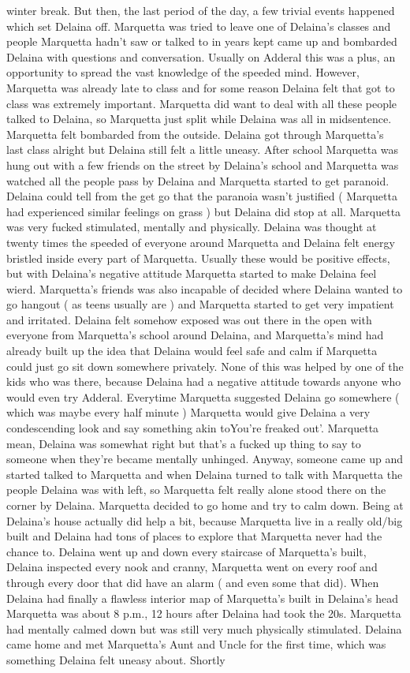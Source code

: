 \documentclass[12pt]{book}
\begin{document}
winter break. But then, the last period of the day, a few trivial events happened which set Delaina off. Marquetta was tried to leave one of Delaina's classes and people Marquetta hadn't saw or talked to in years kept came up and bombarded Delaina with questions and conversation. Usually on Adderal this was a plus, an opportunity to spread the vast knowledge of the speeded mind. However, Marquetta was already late to class and for some reason Delaina felt that got to class was extremely important. Marquetta did want to deal with all these people talked to Delaina, so Marquetta just split while Delaina was all in midsentence. Marquetta felt bombarded from the outside. Delaina got through Marquetta's last class alright but Delaina still felt a little uneasy. After school Marquetta was hung out with a few friends on the street by Delaina's school and Marquetta was watched all the people pass by Delaina and Marquetta started to get paranoid. Delaina could tell from the get go that the paranoia wasn't justified ( Marquetta had experienced similar feelings on grass ) but Delaina did stop at all. Marquetta was very fucked stimulated, mentally and physically. Delaina was thought at twenty times the speeded of everyone around Marquetta and Delaina felt energy bristled inside every part of Marquetta. Usually these would be positive effects, but with Delaina's negative attitude Marquetta started to make Delaina feel wierd. Marquetta's friends was also incapable of decided where Delaina wanted to go hangout ( as teens usually are ) and Marquetta started to get very impatient and irritated. Delaina felt somehow exposed was out there in the open with everyone from Marquetta's school around Delaina, and Marquetta's mind had already built up the idea that Delaina would feel safe and calm if Marquetta could just go sit down somewhere privately. None of this was helped by one of the kids who was there, because Delaina had a negative attitude towards anyone who would even try Adderal. Everytime Marquetta suggested Delaina go somewhere ( which was maybe every half minute ) Marquetta would give Delaina a very condescending look and say something akin toYou're freaked out'. Marquetta mean, Delaina was somewhat right but that's a fucked up thing to say to someone when they're became mentally unhinged. Anyway, someone came up and started talked to Marquetta and when Delaina turned to talk with Marquetta the people Delaina was with left, so Marquetta felt really alone stood there on the corner by Delaina. Marquetta decided to go home and try to calm down. Being at Delaina's house actually did help a bit, because Marquetta live in a really old/big built and Delaina had tons of places to explore that Marquetta never had the chance to. Delaina went up and down every staircase of Marquetta's built, Delaina inspected every nook and cranny, Marquetta went on every roof and through every door that did have an alarm ( and even some that did). When Delaina had finally a flawless interior map of Marquetta's built in Delaina's head Marquetta was about 8 p.m., 12 hours after Delaina had took the 20s. Marquetta had mentally calmed down but was still very much physically stimulated. Delaina came home and met Marquetta's Aunt and Uncle for the first time, which was something Delaina felt uneasy about. Shortly 
\end{document}
